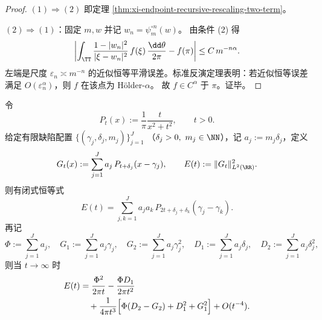 \begin{proof}
\((1)\Rightarrow(2)\) 即定理 \ref{thm:xi-endpoint-recursive-rescaling-two-term}。

\((2)\Rightarrow(1)\)：固定 \(m,w\) 并记 \(w_n=\psi_m^{\circ n}(w)\)。
由条件 (2) 得
\[
\left|
\int_{\TT}\frac{1-|w_n|^2}{|\xi-w_n|^2}\,f(\xi)\,\frac{\dd\theta}{2\pi}
-f(\pi)
\right|
\le C\,m^{-n\alpha}.
\]
左端是尺度 \(\varepsilon_n\asymp m^{-n}\) 的近似恒等平滑误差。标准反演定理表明：若近似恒等误差满足
\(
O(\varepsilon_n^\alpha)
\)，则 \(f\) 在该点为 Hölder-\(\alpha\)。
故 \(f\in C^\alpha\) 于 \(\pi\)。证毕。
\end{proof}

\begin{theorem}\label{thm:xi-poisson-defect-l2-energy-closed-form-three-term}
令
\[
P_t(x):=\frac{1}{\pi}\frac{t}{x^2+t^2},\qquad t>0.
\]
给定有限缺陷配置
\(
\{(\gamma_j,\delta_j,m_j)\}_{j=1}^J
\)
（\(\delta_j>0,\ m_j\in\NN\)），记
\(
a_j:=m_j\delta_j
\)，定义
\[
G_t(x):=\sum_{j=1}^J a_j\,P_{t+\delta_j}(x-\gamma_j),
\qquad
E(t):=\|G_t\|_{L^2(\RR)}^2.
\]
则有闭式恒等式
\begin{equation}\label{eq:xi-poisson-defect-l2-energy-closed-form}
E(t)=\sum_{j,k=1}^J a_j a_k\,P_{2t+\delta_j+\delta_k}(\gamma_j-\gamma_k).
\end{equation}
再记
\[
\Phi:=\sum_{j=1}^J a_j,\quad
G_1:=\sum_{j=1}^J a_j\gamma_j,\quad
G_2:=\sum_{j=1}^J a_j\gamma_j^2,\quad
D_1:=\sum_{j=1}^J a_j\delta_j,\quad
D_2:=\sum_{j=1}^J a_j\delta_j^2,
\]
则当 \(t\to\infty\) 时
\begin{equation}\label{eq:xi-poisson-defect-l2-energy-three-term-expansion}
\begin{aligned}
E(t)
&=\frac{\Phi^2}{2\pi t}
-\frac{\Phi D_1}{2\pi t^2}\\
&\quad+\frac{1}{4\pi t^3}\Bigl[\Phi(D_2-G_2)+D_1^2+G_1^2\Bigr]
+O(t^{-4}).
\end{aligned}
\end{equation}
\end{theorem}

